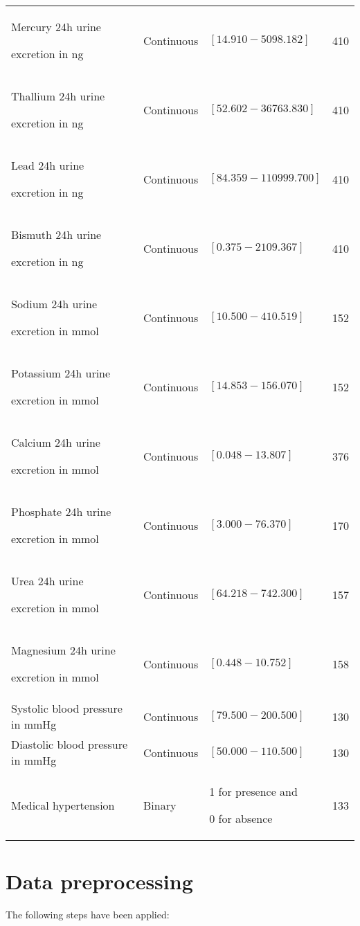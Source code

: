 \begin{center}
\begin{longtable}{ p{} p{} p{} p{} }
Mercury 24h urine\par excretion in ng & Continuous & $[14.910  -  5098.182]$ & 410 \\
Thallium 24h urine\par excretion in ng & Continuous &  $[52.602  -  36763.830]$ & 410 \\
Lead 24h urine\par excretion in ng & Continuous &$[ 84.359  -  110999.700]$ & 410 \\
Bismuth 24h urine\par excretion in ng & Continuous & $[0.375  -  2109.367]$ & 410 \\
Sodium 24h urine\par excretion in mmol& Continuous&   $[10.500 - 410.519]$ & 152\\ 
Potassium 24h urine\par excretion in mmol & Continuous&   $[14.853 - 156.070 ]$ & 152\\ 
Calcium 24h urine\par excretion in mmol & Continuous&   $[0.048 - 13.807]$ & 376\\ 
Phosphate 24h urine\par excretion in mmol & Continuous&   $[3.000 - 76.370 ]$ & 170\\ 
Urea 24h urine\par excretion in mmol & Continuous&   $[64.218 - 742.300]$ & 157\\ 
Magnesium 24h urine \par excretion in mmol & Continuous&   $[0.448 - 10.752]$ & 158\\ 
Systolic blood pressure in mmHg & Continuous&   $[79.500 - 200.500]$ & 130\\ 
Diastolic blood pressure in mmHg & Continuous&   $[50.000- 110.500 ]$ & 130\\
Medical hypertension & Binary & 1 for presence and \par 0 for absence & 133\\
\end{longtable}
\label{table:data_urine_description}
\end{center}

\section{Data preprocessing}
The following steps have been applied:

